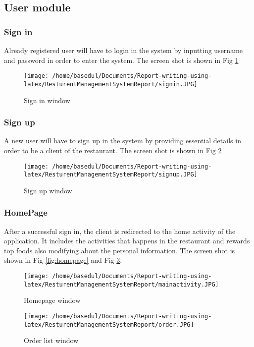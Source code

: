 \documentclass[12pt,a4paper]{article}
\newcommand\tab[1][1cm]{\hspace*{#1}}
\begin{document}
	\subsection{User module}
		\subsubsection{Sign in}
			\tab Already registered user will have to login in the system by inputting username and password in order to enter the system. The screen shot is shown in Fig \ref{fig:login} 
			\begin{figure}[H]
		\centering
		\texttt{[image: /home/basedul/Documents/Report-writing-using-latex/ResturentManagementSystemReport/signin.JPG]}
		\caption{Sign in window}
		\label{fig:login} 
		\end{figure}
		
		\subsubsection{Sign up}
			\tab A new user will have to sign up in the system by providing essential details in order to be a client of the restaurant. The screen shot is shown in Fig \ref{fig:log out} 
			\begin{figure}[H]
		\centering
		\texttt{[image: /home/basedul/Documents/Report-writing-using-latex/ResturentManagementSystemReport/signup.JPG]}
		\caption{Sign up window}
		\label{fig:log out} 
		\end{figure}
		
		\subsubsection{HomePage}
			\tab After a successful sign in, the client is redirected to the home activity of the application.  It includes the activities that happens in the restaurant and rewards  top foods also modifying about the personal information. The screen shot is shown in Fig \ref{fig:homepage} and Fig \ref{fig:topfood1}.
			\begin{figure}[H]
		\centering
		\texttt{[image: /home/basedul/Documents/Report-writing-using-latex/ResturentManagementSystemReport/mainactivity.JPG]}
		\caption{Homepage window}
		\label{fig:homepage} 
		
		
		\vspace{2cm}
		
		
		\texttt{[image: /home/basedul/Documents/Report-writing-using-latex/ResturentManagementSystemReport/order.JPG]}
		\caption{Order list window}
		\label{fig:topfood1} 	
		
		
		\end{figure}
		
\end{document}
